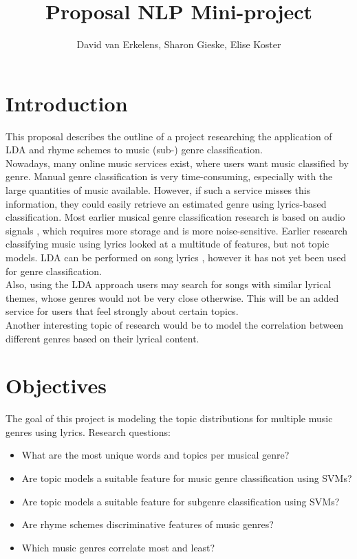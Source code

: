 \documentclass[12pt,a4paper]{amsart}
\title{Proposal NLP Mini-project}
\author{David van Erkelens, Sharon Gieske, Elise Koster}
\date{}
\begin{document}
\maketitle

\section{Introduction}
This proposal describes the outline of a project researching the application of LDA and rhyme schemes to music (sub-) genre classification.\\
Nowadays, many online music services exist, where users want music classified by genre. Manual genre classification is very time-consuming, especially with the large quantities of music available. However, if such a service misses this information, they could easily retrieve an estimated genre using lyrics-based classification. 
Most earlier musical genre classification research is based on audio signals \cite{audio_classification}, which requires more storage and is more noise-sensitive. Earlier research classifying music using lyrics \cite{fell lyrics} looked at a multitude of features, but not topic models. LDA can be performed on song lyrics \cite{lukiccomparison}, however it has not yet been used for genre classification. \\
Also, using the LDA approach users may search for songs with similar lyrical themes, whose genres would not be very close otherwise. This will be an added service for users that feel strongly about certain topics.\\ 
Another interesting topic of research would be to model the correlation between different genres based on their lyrical content.\\


\section{Objectives}
The goal of this project is modeling the topic distributions for multiple music genres using lyrics. 
Research questions:
\begin{itemize}
\item What are the most unique words and topics per musical genre?
\item Are topic models a suitable feature for music genre classification using SVMs?
\item Are topic models a suitable feature for subgenre classification using SVMs?
\item Are rhyme schemes discriminative features of music genres?
\item Which music genres correlate most and least?
\end{itemize}
\end{document}
